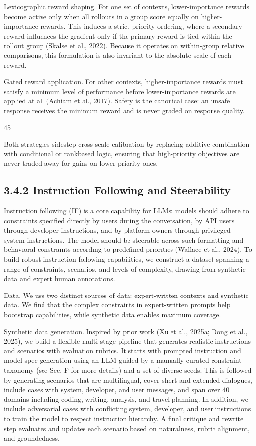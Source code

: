 \documentclass[
  10
]{article}
\begin{document}
Lexicographic reward shaping. For one set of contexts, lower-importance
rewards become active only when all rollouts in a group score equally on
higher-importance rewards. This induces a strict priority ordering,
where a secondary reward influences the gradient only if the primary
reward is tied within the rollout group (Skalse et al., 2022). Because
it operates on within-group relative comparisons, this formulation is
also invariant to the absolute scale of each reward.

Gated reward application. For other contexts, higher-importance rewards
must satisfy a minimum level of performance before lower-importance
rewards are applied at all (Achiam et al., 2017). Safety is the
canonical case: an unsafe response receives the minimum reward and is
never graded on response quality.

45

Both strategies sidestep cross-scale calibration by replacing additive
combination with conditional or rankbased logic, ensuring that
high-priority objectives are never traded away for gains on
lower-priority ones.

\subsection{3.4.2 Instruction Following and
Steerability}\label{instruction-following-and-steerability}

Instruction following (IF) is a core capability for LLMs: models should
adhere to constraints specified directly by users during the
conversation, by API users through developer instructions, and by
platform owners through privileged system instructions. The model should
be steerable across such formatting and behavioral constraints according
to predefined priorities (Wallace et al., 2024). To build robust
instruction following capabilities, we construct a dataset spanning a
range of constraints, scenarios, and levels of complexity, drawing from
synthetic data and expert human annotations.

Data. We use two distinct sources of data: expert-written contexts and
synthetic data. We find that the complex constraints in expert-written
prompts help bootstrap capabilities, while synthetic data enables
maximum coverage.

Synthetic data generation. Inspired by prior work (Xu et al., 2025a;
Dong et al., 2025), we build a flexible multi-stage pipeline that
generates realistic instructions and scenarios with evaluation rubrics.
It starts with prompted instruction and model spec generation using an
LLM guided by a manually curated constraint taxonomy (see Sec. F for
more details) and a set of diverse seeds. This is followed by generating
scenarios that are multilingual, cover short and extended dialogues,
include cases with system, developer, and user messages, and span over
40 domains including coding, writing, analysis, and travel planning. In
addition, we include adversarial cases with conflicting system,
developer, and user instructions to train the model to respect
instruction hierarchy. A final critique and rewrite step evaluates and
updates each scenario based on naturalness, rubric alignment, and
groundedness.
\end{document}
